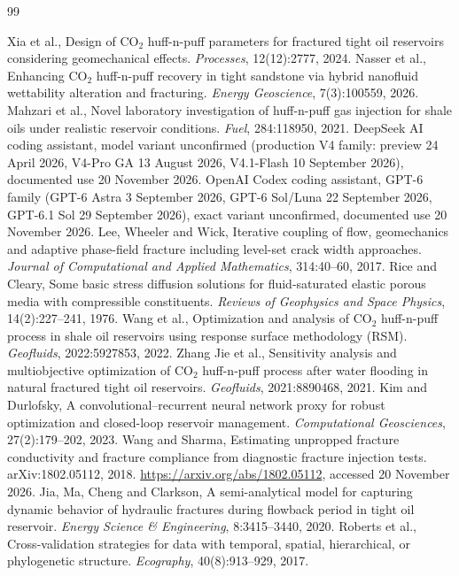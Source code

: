\begin{thebibliography}{99}

 Xia et al., Design of CO$_2$ huff-n-puff parameters for fractured tight oil reservoirs considering geomechanical effects. \emph{Processes}, 12(12):2777, 2024.
 Nasser et al., Enhancing CO$_2$ huff-n-puff recovery in tight sandstone via hybrid nanofluid wettability alteration and fracturing. \emph{Energy Geoscience}, 7(3):100559, 2026.
 Mahzari et al., Novel laboratory investigation of huff-n-puff gas injection for shale oils under realistic reservoir conditions. \emph{Fuel}, 284:118950, 2021.
 DeepSeek AI coding assistant, model variant unconfirmed (production V4 family: preview 24 April 2026, V4-Pro GA 13 August 2026, V4.1-Flash 10 September 2026), documented use 20 November 2026.
 OpenAI Codex coding assistant, GPT-6 family (GPT-6 Astra 3 September 2026, GPT-6 Sol/Luna 22 September 2026, GPT-6.1 Sol 29 September 2026), exact variant unconfirmed, documented use 20 November 2026.
 Lee, Wheeler and Wick, Iterative coupling of flow, geomechanics and adaptive phase-field fracture including level-set crack width approaches. \emph{Journal of Computational and Applied Mathematics}, 314:40--60, 2017.
 Rice and Cleary, Some basic stress diffusion solutions for fluid-saturated elastic porous media with compressible constituents. \emph{Reviews of Geophysics and Space Physics}, 14(2):227--241, 1976.
 Wang et al., Optimization and analysis of CO$_2$ huff-n-puff process in shale oil reservoirs using response surface methodology (RSM). \emph{Geofluids}, 2022:5927853, 2022.
 Zhang Jie et al., Sensitivity analysis and multiobjective optimization of CO$_2$ huff-n-puff process after water flooding in natural fractured tight oil reservoirs. \emph{Geofluids}, 2021:8890468, 2021.
 Kim and Durlofsky, A convolutional--recurrent neural network proxy for robust optimization and closed-loop reservoir management. \emph{Computational Geosciences}, 27(2):179--202, 2023.
 Wang and Sharma, Estimating unpropped fracture conductivity and fracture compliance from diagnostic fracture injection tests. arXiv:1802.05112, 2018. \url{https://arxiv.org/abs/1802.05112}, accessed 20 November 2026.
 Jia, Ma, Cheng and Clarkson, A semi-analytical model for capturing dynamic behavior of hydraulic fractures during flowback period in tight oil reservoir. \emph{Energy Science \& Engineering}, 8:3415--3440, 2020.
 Roberts et al., Cross-validation strategies for data with temporal, spatial, hierarchical, or phylogenetic structure. \emph{Ecography}, 40(8):913--929, 2017.

\end{thebibliography}
